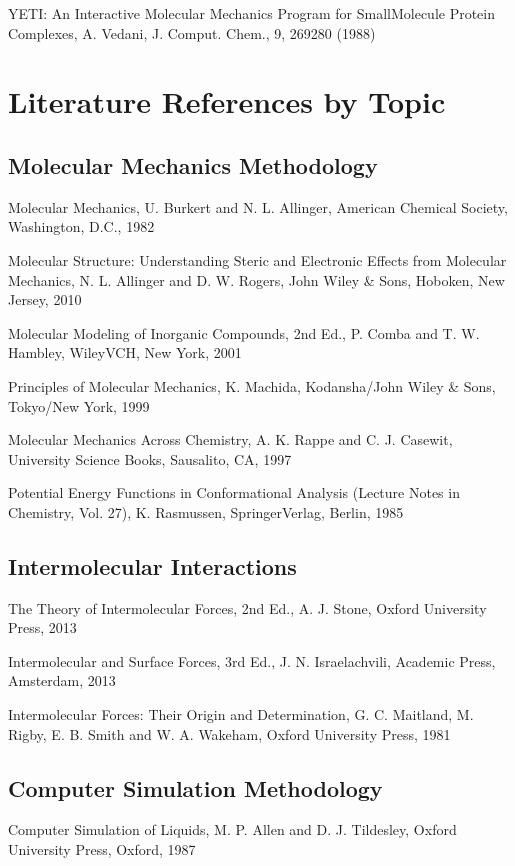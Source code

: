 \documentclass[letterpaper,11pt,english]{sphinxmanual}
\begin{document}

YETI: An Interactive Molecular Mechanics Program for Small\sphinxhyphen{}Molecule Protein Complexes, A. Vedani, J. Comput. Chem., 9, 269\sphinxhyphen{}280 (1988)


\section{Literature References by Topic}
\label{\detokenize{text/references:literature-references-by-topic}}

\subsection{Molecular Mechanics Methodology}
\label{\detokenize{text/references:molecular-mechanics-methodology}}
Molecular Mechanics, U. Burkert and N. L. Allinger, American Chemical Society, Washington, D.C., 1982

Molecular Structure: Understanding Steric and Electronic Effects from Molecular Mechanics, N. L. Allinger and D. W. Rogers, John Wiley \& Sons, Hoboken, New Jersey, 2010

Molecular Modeling of Inorganic Compounds, 2nd Ed., P. Comba and T. W. Hambley, Wiley\sphinxhyphen{}VCH, New York, 2001

Principles of Molecular Mechanics, K. Machida, Kodansha/John Wiley \& Sons, Tokyo/New York, 1999

Molecular Mechanics Across Chemistry, A. K. Rappe and C. J. Casewit, University Science Books, Sausalito, CA, 1997

Potential Energy Functions in Conformational Analysis (Lecture Notes in Chemistry, Vol. 27), K. Rasmussen, Springer\sphinxhyphen{}Verlag, Berlin, 1985


\subsection{Intermolecular Interactions}
\label{\detokenize{text/references:intermolecular-interactions}}
The Theory of Intermolecular Forces, 2nd Ed., A. J. Stone, Oxford University Press, 2013

Intermolecular and Surface Forces, 3rd Ed., J. N. Israelachvili, Academic Press, Amsterdam, 2013

Intermolecular Forces: Their Origin and Determination, G. C. Maitland, M. Rigby, E. B. Smith and W. A. Wakeham, Oxford University Press, 1981


\subsection{Computer Simulation Methodology}
\label{\detokenize{text/references:computer-simulation-methodology}}
Computer Simulation of Liquids, M. P. Allen and D. J. Tildesley, Oxford University Press, Oxford, 1987
\end{document}
